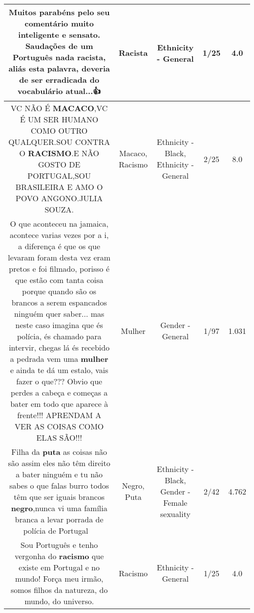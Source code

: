 \documentclass[11pt]{article}
\newlength\mylength
\begin{document}
\begin{center}
\begin{longtable}{|C{.65\mylength}|C{.30\mylength}|C{.12\mylength}|C{.12\mylength}|C{.12\mylength}|}
  \small Muitos parabéns pelo seu comentário muito inteligente e sensato. Saudações de um Português nada \textbf{racista}, aliás esta palavra, deveria de ser erradicada do vocabulário atual...👍\normalsize   & Racista & Ethnicity - General & 1/25 & 4.0 \\  \hline
  \small VC NÃO É \textbf{MACACO},VC É UM SER HUMANO COMO OUTRO QUALQUER.SOU CONTRA O \textbf{RACISMO}.E NÃO GOSTO DE PORTUGAL,SOU BRASILEIRA E AMO O POVO ANGONO.JULIA SOUZA.\normalsize   & Macaco, Racismo & Ethnicity - Black, Ethnicity - General & 2/25 & 8.0 \\  \hline
  \small O que aconteceu na jamaica, acontece varias vezes por a i, a diferença é que os que levaram foram desta vez eram pretos e foi filmado, porisso é que estão com tanta coisa porque quando são os brancos a serem espancados ninguém quer saber... mas neste caso imagina que és polícia, és chamado para intervir, chegas lá és recebido a pedrada vem uma \textbf{mulher} e ainda te dá um estalo, vais fazer o que??? Obvio que perdes a cabeça e começas a bater em todo que aparece à frente!!! APRENDAM A VER AS COISAS COMO ELAS SÃO!!!\normalsize   & Mulher & Gender - General & 1/97 & 1.031 \\  \hline
  \small Filha da \textbf{puta} as coisas não são assim eles não têm direito a bater ninguém e tu não sabes o que falas burro todos têm que ser iguais brancos \textbf{negro},nunca vi uma família branca a levar porrada de polícia de Portugal 🖕🏾\normalsize   & Negro, Puta & Ethnicity - Black, Gender - Female sexuality & 2/42 & 4.762 \\  \hline
  \small Sou Português e tenho vergonha do \textbf{racismo} que existe em Portugal e no mundo! Força meu irmão, somos filhos da natureza, do mundo, do universo.\normalsize   & Racismo & Ethnicity - General & 1/25 & 4.0 \\  \hline

\end{longtable}
\end{center}
\end{document}
